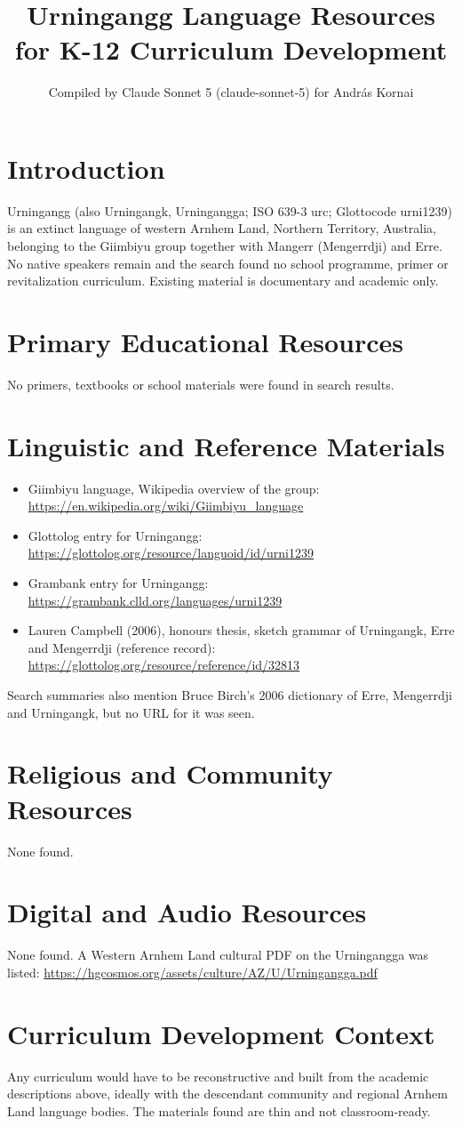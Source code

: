 \documentclass[12pt]{article}
\title{Urningangg Language Resources for K-12 Curriculum Development}
\author{Compiled by Claude Sonnet 5 (claude-sonnet-5) for Andr\'as Kornai}
\date{}
\begin{document}
\maketitle
\section{Introduction}
Urningangg (also Urningangk, Urningangga; ISO 639-3 urc; Glottocode urni1239) is an extinct language of western Arnhem Land, Northern Territory, Australia, belonging to the Giimbiyu group together with Mangerr (Mengerrdji) and Erre. No native speakers remain and the search found no school programme, primer or revitalization curriculum. Existing material is documentary and academic only.
\section{Primary Educational Resources}
No primers, textbooks or school materials were found in search results.
\section{Linguistic and Reference Materials}
\begin{itemize}
\item Giimbiyu language, Wikipedia overview of the group: \url{https://en.wikipedia.org/wiki/Giimbiyu_language}
\item Glottolog entry for Urningangg: \url{https://glottolog.org/resource/languoid/id/urni1239}
\item Grambank entry for Urningangg: \url{https://grambank.clld.org/languages/urni1239}
\item Lauren Campbell (2006), honours thesis, sketch grammar of Urningangk, Erre and Mengerrdji (reference record): \url{https://glottolog.org/resource/reference/id/32813}
\end{itemize}
Search summaries also mention Bruce Birch's 2006 dictionary of Erre, Mengerrdji and Urningangk, but no URL for it was seen.
\section{Religious and Community Resources}
None found.
\section{Digital and Audio Resources}
None found. A Western Arnhem Land cultural PDF on the Urningangga was listed: \url{https://hgcosmos.org/assets/culture/AZ/U/Urningangga.pdf}
\section{Curriculum Development Context}
Any curriculum would have to be reconstructive and built from the academic descriptions above, ideally with the descendant community and regional Arnhem Land language bodies. The materials found are thin and not classroom-ready.
\end{document}
